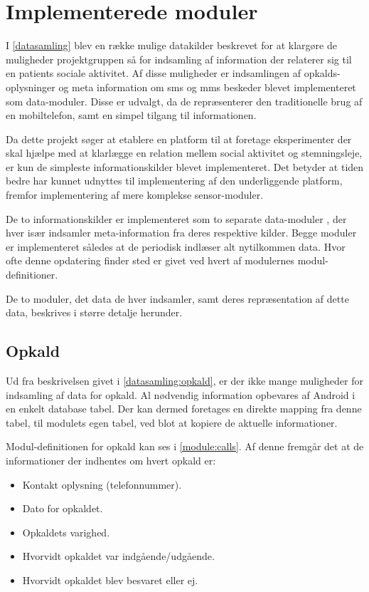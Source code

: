 \chapter{Implementerede moduler}\label{implementerede_moduler}
I \cref{datasamling} blev en række mulige datakilder beskrevet for at klargøre de muligheder projektgruppen så for indsamling af information der relaterer sig til en patients sociale aktivitet.
Af disse muligheder er indsamlingen af opkalds-oplysninger og meta information om sms og mms beskeder blevet implementeret som data-moduler.
Disse er udvalgt, da de repræsenterer den traditionelle brug af en mobiltelefon, samt en simpel tilgang til informationen.

Da dette projekt søger at etablere en platform til at foretage eksperimenter der skal hjælpe med at klarlægge en relation mellem social aktivitet og stemningsleje, er kun de simpleste informationskilder blevet implementeret.
Det betyder at tiden bedre har kunnet udnyttes til implementering af den underliggende platform, fremfor implementering af mere komplekse sensor-moduler.

De to informationskilder er implementeret som to separate data-moduler , der hver især indsamler meta-information fra deres respektive kilder.
Begge moduler er implementeret således at de periodisk indlæser alt nytilkommen data.
Hvor ofte denne opdatering finder sted er givet ved hvert af modulernes modul-definitioner.

De to moduler, det data de hver indsamler, samt deres repræsentation af dette data, beskrives i større detalje herunder.

\section{Opkald}\label{implementerede_moduler:opkald}
Ud fra beskrivelsen givet i \cref{datasamling:opkald}, er der ikke mange muligheder for indsamling af data for opkald.
Al nødvendig information opbevares af Android i en enkelt database tabel.
Der kan dermed foretages en direkte mapping fra denne tabel, til modulets egen tabel, ved blot at kopiere de aktuelle informationer.

Modul-definitionen for opkald kan ses i \cref{module:calls}.
Af denne fremgår det at de informationer der indhentes om hvert opkald er:
\begin{itemize}
\item Kontakt oplysning (telefonnummer).
\item Dato for opkaldet.
\item Opkaldets varighed.
\item Hvorvidt opkaldet var indgående/udgående.
\item Hvorvidt opkaldet blev besvaret eller ej.
\end{itemize}


